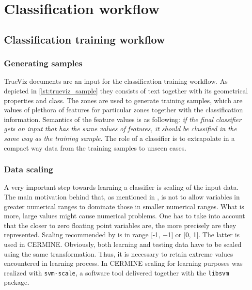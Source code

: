 \chapter{Classification workflow}

\section{Classification training workflow}
\subsection{Generating samples}
TrueViz documents are an input for the classification training workflow. As depicted in \ref{lst:trueviz_sample} they consists of text together with its geometrical properties and class. The zones are used to generate training samples, which are values of plethora of features for particular zones together with the classification information. Semantics of the feature values is as following: \textit{if the final classifier gets an input that has the same values of features, it should be classified in the same way as the training sample}. The role of a classifier is to extrapolate in a compact way data from the training samples to unseen cases.

\subsection{Data scaling}
A very important step towards learning a classifier is scaling of the input data. The main motivation behind that, as mentioned in \cite{Chih-WeiHsu2010}, is not to allow variables in greater numerical ranges to dominate those in smaller numerical ranges. What is more, large values might cause numerical problems. One has to take into account that the closer to zero floating point variables are, the more precisely are they represented. Scaling recommended by \cite{Chih-WeiHsu2010} is in range [-1, +1] or  [0, 1]. The latter is used in CERMINE. Obviously, both learning and testing data have to be scaled using the same transformation. Thus, it is necessary to retain extreme values encountered in learning process.
In CERMINE scaling for learning purposes was realized with \verb+svm-scale+, a software tool delivered together with the \verb+libsvm+ package.

